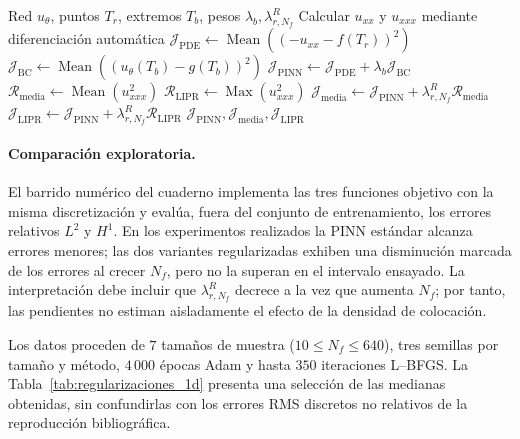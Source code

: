 \begin{algorithm}
\caption{Cálculo de las tres pérdidas para Poisson 1D}
\label{alg:lipr}
\begin{algorithmic}[1]
\Require Red $u_\theta$, puntos $T_r$, extremos $T_b$, pesos $\lambda_b,\lambda_{r,N_f}^{R}$
\State Calcular $u_{xx}$ y $u_{xxx}$ mediante diferenciación automática
\State $\mathcal J_{\mathrm{PDE}}\gets \operatorname{Mean}((-u_{xx}-f(T_r))^2)$
\State $\mathcal J_{\mathrm{BC}}\gets \operatorname{Mean}((u_\theta(T_b)-g(T_b))^2)$
\State $\mathcal J_{\mathrm{PINN}}\gets\mathcal J_{\mathrm{PDE}}+\lambda_b\mathcal J_{\mathrm{BC}}$
\State $\mathcal R_{\mathrm{media}}\gets\operatorname{Mean}(u_{xxx}^2)$ 
\State $\mathcal R_{\mathrm{LIPR}}\gets\operatorname{Max}(u_{xxx}^2)$ 
\State $\mathcal J_{\mathrm{media}}\gets\mathcal J_{\mathrm{PINN}}+\lambda_{r,N_f}^{R}\mathcal R_{\mathrm{media}}$
\State $\mathcal J_{\mathrm{LIPR}}\gets\mathcal J_{\mathrm{PINN}}+\lambda_{r,N_f}^{R}\mathcal R_{\mathrm{LIPR}}$
\State \Return $\mathcal J_{\mathrm{PINN}},\mathcal J_{\mathrm{media}},\mathcal J_{\mathrm{LIPR}}$
\end{algorithmic}
\end{algorithm}

\paragraph{Comparación exploratoria.}
El barrido numérico del cuaderno implementa las tres funciones objetivo con la misma discretización y evalúa, fuera del conjunto de entrenamiento, los errores relativos $L^2$ y $H^1$. En los experimentos realizados la PINN estándar alcanza errores menores; las dos variantes regularizadas exhiben una disminución marcada de los errores al crecer $N_f$, pero no la superan en el intervalo ensayado. La interpretación debe incluir que $\lambda_{r,N_f}^{R}$ decrece a la vez que aumenta $N_f$; por tanto, las pendientes no estiman aisladamente el efecto de la densidad de colocación.

Los datos proceden de $7$ tamaños de muestra ($10\leq N_f\leq640$), tres semillas por tamaño y método, $4\,000$ épocas Adam y hasta $350$ iteraciones L--BFGS. La Tabla~\ref{tab:regularizaciones_1d} presenta una selección de las medianas obtenidas, sin confundirlas con los errores RMS discretos no relativos de la reproducción bibliográfica.

